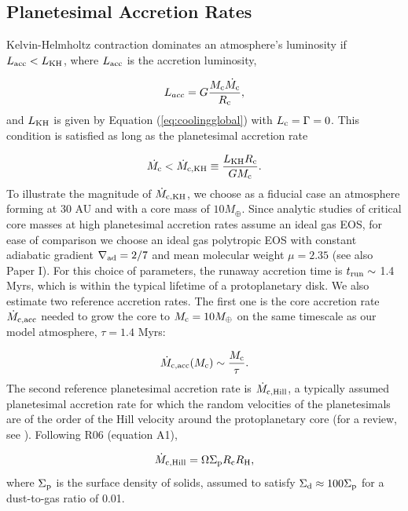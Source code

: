 \subsection{Planetesimal Accretion Rates}
\label{raf1}

Kelvin-Helmholtz contraction dominates an atmosphere's luminosity if  $L_{\mathrm{acc}} < L_{\rm{KH}}$, where $L_{\rm{acc}}$ is the accretion luminosity,

\begin{equation}
\label{eq:Lacc}
L_{acc}=G \frac{M_{\rm{c}} \dot{M_{\rm{c}}}}{R_{\rm{c}}},
\end{equation}
and $L_{\rm KH}$ is given by Equation (\ref{eq:coolingglobal}) with $L_{\rm c}=\Gamma=0$. This condition is satisfied as long as the planetesimal accretion rate 

\begin{equation}
\label{eq:McdotKH}
\dot{M_{\rm c}}<\dot{M}_{\rm c, KH} \equiv \frac{L_{\rm KH} R_{\rm c}}{G M_{\rm c}}.
\end{equation} 
To illustrate the magnitude of $\dot{M}_{\rm c, KH}$, we choose as a fiducial case an atmosphere forming at 30 AU and with a core mass of $10 M_{\oplus}$. Since analytic studies of critical core masses at high planetesimal accretion rates assume an ideal gas EOS, for ease of comparison we choose an ideal gas polytropic EOS with constant adiabatic gradient $\nabla_{\rm ad}=2/7$ and mean molecular weight $\mu=2.35$ (see also Paper I). For this choice of parameters, the runaway accretion time is $t _{\rm run}\sim$ 1.4 Myrs, which is within the typical lifetime of a protoplanetary disk. We also estimate two reference accretion rates. The first one is the core accretion rate $\dot{M}_{\rm c, acc}$ needed to grow the core to $M_{\rm c}=10 M_{\oplus}$ on the same timescale as our model atmosphere, $\tau=1.4$ Myrs:

\begin{equation}
\label{eq:Mcdot}
\dot{M}_{\rm{c,acc}}(M_{\rm{c}}) \sim \frac{M_{\rm{c}}}{\tau}.
\end{equation}
The second reference planetesimal accretion rate is $\dot{M}_{\rm c, Hill}$, a typically assumed planetesimal accretion rate for which the random velocities of the planetesimals are of the order of the Hill velocity around the protoplanetary core (for a review, see \citealt{goldreich04}). Following R06 (equation A1),


\begin{equation}
\label{eq:MdotHill}
\dot{M}_{\rm{c,Hill}}=\Omega \Sigma_{\rm p} R_{\rm c} R_{\rm H},
\end{equation}
where $\Sigma_{\rm p}$ is the surface density of solids, assumed to satisfy $\Sigma_{\rm d} \approx 100 \Sigma_{\rm p}$ for a dust-to-gas ratio of 0.01.

